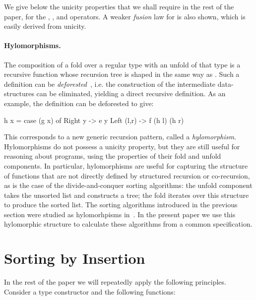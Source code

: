 \documentclass[a4paper,11pt]{llncs}
\begin{document}
We give below the unicity properties that we shall require in the rest
of the paper, for the , , and
 operators.  A weaker \emph{fusion} law for 
is also shown, which is easily derived from unicity.









\paragraph{Hylomorphisms.}

The composition of a fold over a regular type  with an unfold of
that type is a recursive function whose recursion tree is shaped in
the same way as . Such a definition can be
\emph{deforested}~\cite{WadlerP:dtpet}, i.e. the construction of the
intermediate data-structures can be eliminated, yielding a direct
recursive definition. As an example, the definition  can be deforested
to give:
\begin{code}
h x = case (g x) of
      Right y    -> e y
      Left (l,r) -> f (h l) (h r)
\end{code}

This corresponds to a new generic recursion pattern, called a
\emph{hylomorphism}. Hylomorphisms do not possess a unicity property,
but they are still useful for reasoning about programs, using the
properties of their fold and unfold components.
In particular, hylomorphisms are useful for capturing the structure of
functions that are not directly defined by structured recursion or
co-recursion, as is the case of the divide-and-conquer sorting
algorithms: the unfold component takes the unsorted list and
constructs a tree; the fold iterates over this structure to produce
the sorted list.
The sorting algorithms introduced in the previous section were studied
as hylomorhpisms in~\cite{AugusteijnL:sorm}. In the present paper we
use this hylomorphic structure to calculate these algorithms from a
common specification.






\section{Sorting by Insertion}
\label{sec:sori}

In the rest of the paper we will repeatedly apply the following
principles. Consider a type constructor  and the following
functions:
\end{document}
